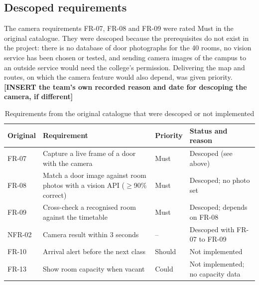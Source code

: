 \documentclass[12pt,a4paper]{report}
\newcommand{\tablespacing}{\singlespacing\small}
\newcommand{\placeholder}[1]{\textbf{[INSERT #1]}}
\begin{document}
\subsection{Descoped requirements}\label{sec:descoped}
The camera requirements FR-07, FR-08 and FR-09 were rated Must in the original catalogue. They were descoped because the prerequisites do not exist in the project: there is no database of door photographs for the 40 rooms, no vision service has been chosen or tested, and sending camera images of the campus to an outside service would need the college's permission. Delivering the map and routes, on which the camera feature would also depend, was given priority. \placeholder{the team's own recorded reason and date for descoping the camera, if different}

\begin{table}[htbp]
\centering\tablespacing
\caption{Requirements from the original catalogue that were descoped or not implemented}\label{tab:descoped}
\begin{tabular}{p{1.6cm}p{7.2cm}p{1.4cm}p{3.6cm}}
\toprule
Original & Requirement & Priority & Status and reason \\
\midrule
FR-07 & Capture a live frame of a door with the camera & Must & Descoped (see above) \\
FR-08 & Match a door image against room photos with a vision API ($\geq$90\% correct) & Must & Descoped; no photo set \\
FR-09 & Cross-check a recognised room against the timetable & Must & Descoped; depends on FR-08 \\
NFR-02 & Camera result within 3 seconds & -- & Descoped with FR-07 to FR-09 \\
FR-10 & Arrival alert before the next class & Should & Not implemented \\
FR-13 & Show room capacity when vacant & Could & Not implemented; no capacity data \\
\bottomrule
\end{tabular}
\end{table}
\end{document}
